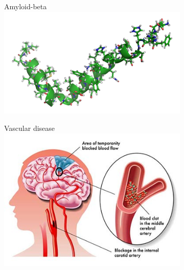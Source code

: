 \documentclass[10pt,xcolor=table]{beamer}
\begin{document}
\begin{frame}
\begin{figure}
\begin{subfigure}{0.47\textwidth}
\centering
\vspace{1em}
Amyloid-beta\\
\includegraphics[scale=0.04]{amyloid_beta.png}
\end{subfigure}
\begin{subfigure}{0.47\textwidth}
\centering
\vspace{1em}
Vascular disease\\
\includegraphics[scale=0.20]{vascular_disease.jpg}
\end{subfigure}

\end{figure}

\vspace{-1em}

\end{frame}
\end{document}
